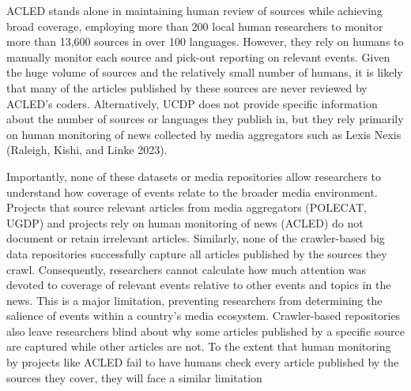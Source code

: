 \documentclass[
  letterpaper,
  DIV=11,
  numbers=noendperiod]{scrartcl}
\begin{document}
ACLED stands alone in maintaining human review of sources while
achieving broad coverage, employing more than 200 local human
researchers to monitor more than 13,600 sources in over 100 languages.
However, they rely on humans to manually monitor each source and
pick-out reporting on relevant events. Given the huge volume of sources
and the relatively small number of humans, it is likely that many of the
articles published by these sources are never reviewed by ACLED's
coders. Alternatively, UCDP does not provide specific information about
the number of sources or languages they publish in, but they rely
primarily on human monitoring of news collected by media aggregators
such as Lexis Nexis (Raleigh, Kishi, and Linke 2023).

Importantly, none of these datasets or media repositories allow
researchers to understand how coverage of events relate to the broader
media environment. Projects that source relevant articles from media
aggregators (POLECAT, UGDP) and projects rely on human monitoring of
news (ACLED) do not document or retain irrelevant articles. Similarly,
none of the crawler-based big data repositories successfully capture all
articles published by the sources they crawl. Consequently, researchers
cannot calculate how much attention was devoted to coverage of relevant
events relative to other events and topics in the news. This is a major
limitation, preventing researchers from determining the salience of
events within a country's media ecosystem. Crawler-based repositories
also leave researchers blind about why some articles published by a
specific source are captured while other articles are not. To the extent
that human monitoring by projects like ACLED fail to have humans check
every article published by the sources they cover, they will face a
similar limitation
\end{document}
